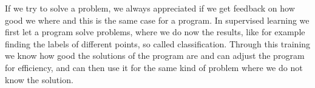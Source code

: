 
If we try to solve a problem, we always appreciated if we get feedback on how good we where and this is the same case for a program.
In supervised learning we first let a program solve problems,
where we do now the results, like for example finding the labels of different points, so called classification.
Through this training we know how good the solutions of the program are and can adjust the program for efficiency,
and can then use it for the same kind of problem where we do not know the solution.

